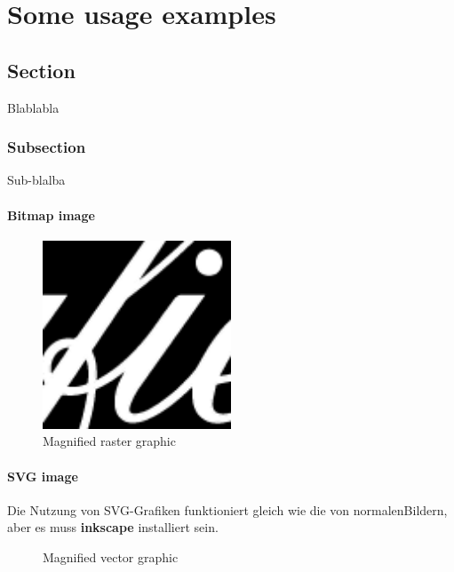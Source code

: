 \chapter{Some usage examples}
\label{ch:usage-examples}

\section{Section}
\label{sec:section}
Blablabla

\subsection{Subsection}
\label{subsec:subsection}
Sub-blalba

\subsubsection{Bitmap image}

\begin{figure}[!ht]
    \centering
    \includegraphics[width=0.5\textwidth, interpolate=false]{res/magnified_bitmap}
    \caption{Magnified raster graphic}
    \label{fig:Bitmap}
\end{figure}

\subsubsection{SVG image}
Die Nutzung von SVG-Grafiken funktioniert gleich wie die von \glqq normalen\grqq Bildern, aber es muss \textbf{inkscape} installiert sein.

\begin{figure}[!ht]
    \centering
    
    \caption{Magnified vector graphic}
    \label{fig:Vector}
\end{figure}

